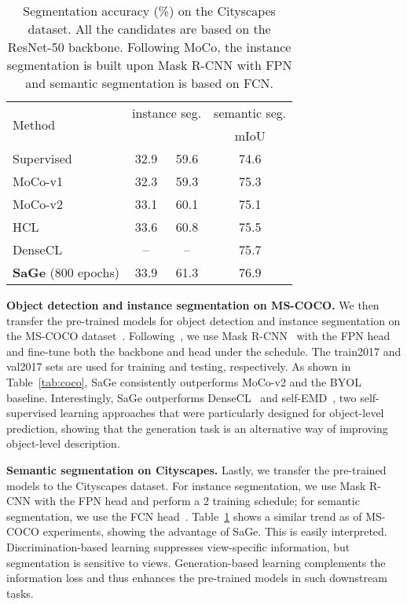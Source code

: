 \documentclass[10pt,twocolumn,letterpaper]{article}
\begin{document}
\begin{table}[!t]
\centering
\fontsize{9.5}{11.0}\selectfont
\setlength{\tabcolsep}{2.0mm}
\begin{tabular}{l|cc|c}
\toprule
\multirow{2}{*}{Method} &\multicolumn{2}{c|}{instance seg.} & semantic seg. \\ 
                         &  &
                         & mIoU\\ \midrule
Supervised &       32.9     &      59.6  & 74.6    \\ \midrule
MoCo-v1~\cite{he2020momentum} &   32.3    &    59.3  & 75.3               \\
MoCo-v2~\cite{chen2020improved} &   33.1   &     60.1     & 75.1             \\
HCL~\cite{HCL} & 33.6          &   60.8  &  75.5                \\ 
DenseCL~\cite{wang2021dense} & --          &  --  &  75.7                \\ \midrule
\textbf{SaGe} (800 epochs)  &   33.9   &     61.3    & 76.9            \\ 
\bottomrule
\end{tabular}
\caption{Segmentation accuracy (\%) on the Cityscapes dataset. All the candidates are based on the ResNet-50 backbone. Following MoCo, the instance segmentation is built upon Mask R-CNN with FPN and semantic segmentation is based on FCN.}
\label{tab:cityscapes}
\end{table}

\vspace{0.1cm}\noindent
\hspace{0.2cm}\textbf{Object detection and instance segmentation on MS-COCO.} We then transfer the pre-trained models for object detection and instance segmentation on the MS-COCO dataset~\cite{lin2014coco}. Following~\cite{he2020momentum}, we use Mask R-CNN~\cite{he2017mask} with the FPN head~\cite{lin2017feature} and fine-tune both the backbone and head under the  schedule. The train2017 and val2017 sets are used for training and testing, respectively. As shown in Table~\ref{tab:coco}, SaGe consistently outperforms MoCo-v2 and the BYOL baseline. Interestingly, SaGe outperforms DenseCL~\cite{wang2021dense} and self-EMD~\cite{liu2020self}, two self-supervised learning approaches that were particularly designed for object-level prediction, showing that the generation task is an alternative way of improving object-level description.

\vspace{0.1cm}\noindent
\hspace{0.2cm}\textbf{Semantic segmentation on Cityscapes.}
Lastly, we transfer the pre-trained models to the Cityscapes dataset. For instance segmentation, we use Mask R-CNN with the FPN head and perform a 2 training schedule; for semantic segmentation, we use the FCN head~\cite{long2015fully}. Table~\ref{tab:cityscapes} shows a similar trend as of MS-COCO experiments, showing the advantage of SaGe. This is easily interpreted. Discrimination-based learning suppresses view-specific information, but segmentation is sensitive to views. Generation-based learning complements the information loss and thus enhances the pre-trained models in such downstream tasks.
\end{document}
